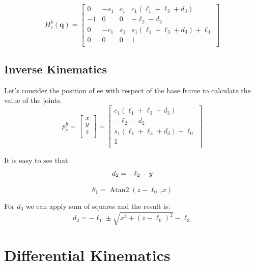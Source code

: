 \documentclass[a4paper,12pt]{article}
\renewcommand*{\t}{\theta}
\renewcommand*{\l}{\ell}
\newcommand*{\q}{\bm{q}}
\begin{document}
\[
H^b_e(\q) = \begin{bmatrix}
    0    &  - s_1 & c_1 & c_1(\l_1+\l_3+d_3)\\
    -1   & 0      &  0  &  -\l_2 - d_2 \\
    0    & -c_{1} & s_1 & s_1(\l_1+\l_3+d_3) + \l_0 \\
    0    &     0  & 0   &        1       \\
\end{bmatrix}
\]

\subsection{Inverse Kinematics}
Let's consider the position of ee with respect of the base frame to calculate the value of the joints.
\[
p^b_e = \begin{bmatrix}
    x \\ y \\ z \\
\end{bmatrix}
=
\begin{bmatrix}
    c_1(\l_1+\l_3+d_3)\\
     -\l_2 - d_2 \\
    s_1(\l_1+\l_3+d_3) + \l_0 \\
    1        \\
\end{bmatrix}
\]

It is easy to see that
\[
d_2 = - \l_2 - y \\
\]

\[
\t_1 = \mathop{Atan2}(z-\l_0, x)
\]


For $d_3$ we can apply sum of squares and the result is:
\[
  d_3 = -\l_1 \pm \sqrt{x^2+(z-\l_0)^2} - \l_3  
\]

\section{Differential Kinematics}
\end{document}

